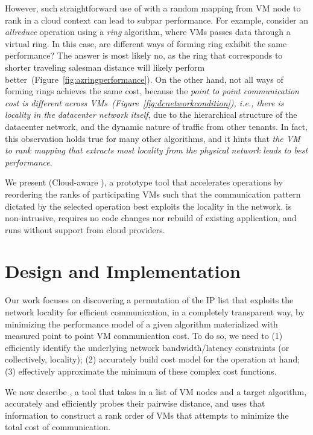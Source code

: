 However, such straightforward use of \mpi with a random mapping from VM node to rank in a cloud context can lead to subpar performance. For example, consider an \textit{allreduce} operation using a \textit{ring} algorithm, where VMs passes data through a virtual ring. In this case, are different ways of forming ring exhibit the same performance? The answer is most likely no, as the ring that corresponds to shorter traveling salesman distance will likely perform better~(Figure~\ref{fig:azringperformance}). On the other hand, not all ways of forming rings achieves the same cost, because the \textit{point to point communication cost is different across VMs~(Figure~\ref{fig:dcnetworkcondition}), i.e., there is locality in the datacenter network itself}, due to the hierarchical structure of the datacenter network, and the dynamic nature of traffic from other tenants. In fact, this observation holds true for many other \mpi algorithms, and it hints that \textit{the VM to rank mapping that extracts most locality from the physical network leads to best performance}. 

We present \cmpi (Cloud-aware \mpi), a prototype tool that accelerates \mpi operations by reordering the ranks of participating VMs such that the communication pattern dictated by the selected \mpi operation best exploits the locality in the network. \cmpi is non-intrusive, requires no code changes nor rebuild of existing application, and runs without support from cloud providers. 

\section{Design and Implementation}
Our work focuses on discovering a permutation of the IP list that exploits the network locality for efficient communication, in a completely transparent way, by minimizing the performance model of a given \mpi algorithm materialized with measured point to point VM communication cost. To do so, we need to (1) efficiently identify the underlying network bandwidth/latency constraints (or collectively, locality); (2) accurately build cost model for the \mpi operation at hand; (3) effectively approximate the minimum of these complex cost functions.

We now describe \cmpi, a tool that takes in a list of VM nodes and a target \collectives algorithm, accurately and efficiently probes their pairwise distance, and uses that information to construct a rank order of VMs that attempts to minimize the total cost of communication.


